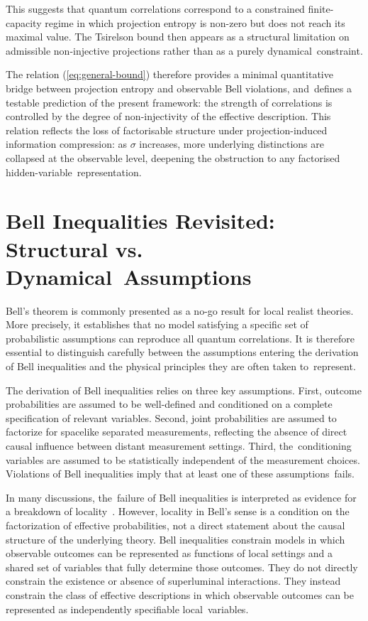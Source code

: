 \documentclass[quantumrep,article,accept,pdftex,oneauthor]{Definitions/mdpi}
\theoremstyle{remark}
\begin{document}
  This suggests that quantum correlations correspond to a constrained finite-capacity
  regime in which projection entropy is non-zero but does not reach its maximal value.
  The Tsirelson bound then appears as a structural limitation on admissible
  non-injective projections rather than as a purely dynamical~constraint.

  The relation (\ref{eq:general-bound}) therefore provides a minimal quantitative bridge
  between projection entropy and observable Bell violations, and~defines a testable
  prediction of the present framework: the strength of correlations is controlled by
  the degree of non-injectivity of the effective description.
  This relation reflects the loss of factorisable structure under
  projection-induced information compression: as $\sigma$ increases, more underlying
  distinctions are collapsed at the observable level, deepening the obstruction to any
  factorised hidden-variable~representation.

  \section{Bell Inequalities Revisited: Structural vs. Dynamical~Assumptions}
  \label{sec:abstract-math-model}

  Bell’s theorem is commonly presented as a no-go result for local realist theories.
  More precisely, it establishes that no model satisfying a specific set of probabilistic
  assumptions can reproduce all quantum correlations.
  It is therefore essential to distinguish carefully between the assumptions entering
  the derivation of Bell inequalities and the physical principles they are often taken to~represent.

  The derivation of Bell inequalities relies on three key assumptions.
  First, outcome probabilities are assumed to be well-defined and conditioned on a
  complete specification of relevant variables.
  Second, joint probabilities are assumed to factorize for spacelike separated
  measurements, reflecting the absence of direct causal influence between distant measurement settings.
  Third, the~conditioning variables are assumed to be statistically independent of the measurement choices.
  Violations of Bell inequalities imply that at least one of these assumptions~fails.

  In many discussions, the~failure of Bell inequalities is interpreted as evidence for a breakdown of
  locality~\cite{Bell1964}.
  However, locality in Bell’s sense is a condition on the factorization of effective
  probabilities, not a direct statement about the causal structure of the underlying
  theory.
  Bell inequalities constrain models in which observable outcomes can be represented
  as functions of local settings and a shared set of variables that fully determine
  those outcomes.
  They do not directly constrain the existence or absence of superluminal interactions.
  They instead constrain the class of effective descriptions in which observable outcomes
  can be represented as independently specifiable local~variables.
\end{document}
